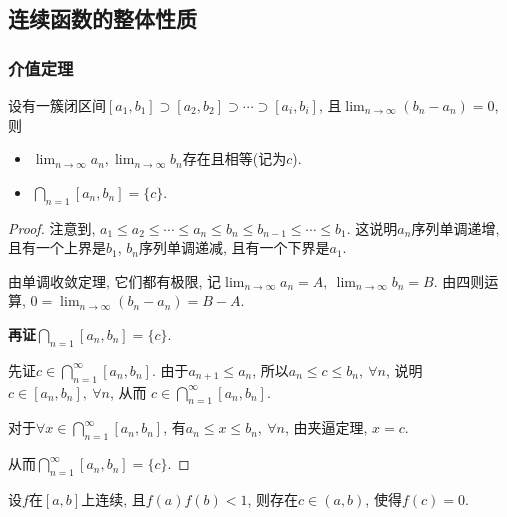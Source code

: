
\subsection{连续函数的整体性质}
\subsubsection{介值定理}
\begin{theorem}[区间套原理]
    设有一簇闭区间$[ a_1,b_1 ] \supset [ a_2,b_2 ] \supset \cdots \supset [ a_i,b_i ] $, 且$\displaystyle \lim_{n \to \infty} \left( b_n - a_n \right) = 0$, 则
    \begin{itemize}
        \item $\displaystyle \lim_{n \to \infty}a_n , \lim_{n \to \infty} b_n$存在且相等(记为$c$).
        \item $\bigcap _{n=1} [ a_n, b_n ] = \{ c \}$.
    \end{itemize}
\end{theorem}
\begin{proof}
    注意到, $a_1 \le  a_2 \le  \cdots \le a_n \le b_n \le b_{n-1} \le  \cdots \le  b_1$.
    这说明$a_n$序列单调递增, 且有一个上界是$b_1$, $b_n$序列单调递减, 且有一个下界是$a_1$. 
    
    由单调收敛定理, 它们都有极限, 记$\displaystyle \lim_{n \to \infty}a_n = A, \ \lim_{n \to \infty}b_n = B$. 由四则运算, $\displaystyle 0 = \lim_{n \to \infty} \left( b_n  - a_n \right) = B - A$.

    \textbf{再证}$\bigcap _{n=1} [ a_n, b_n ] = \{ c \}$.
    
    先证$c \in \bigcap_{n=1}^{\infty}[a_n, b_n]$. 由于$a_{n+1} \le  a_n$, 所以$a_n \le  c \le  b_n,\ \forall n$, 说明$c \in [a_n, b_n], \ \forall n$, 从而 $c \in \bigcap_{n=1}^{\infty}[a_n, b_n]$.

    对于$\forall x \in \bigcap_{n=1}^{\infty} [a_n, b_n ]$, 有$a_n 
    \le x \le b_n, \ \forall n$, 由夹逼定理, $x = c$. 
    
    从而$\bigcap_{n=1}^{\infty} [a_n, b_n ] = \{ c \}$.
\end{proof}

\begin{theorem}[介值定理]
    设$f$在$[a,b]$上连续, 且$f(a) f(b) < 1$, 则存在$c \in (a,b)$, 使得$f(c) = 0$.
\end{theorem}

